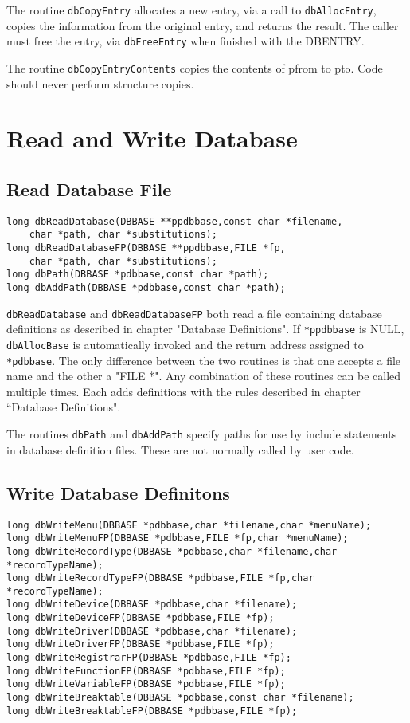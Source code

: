 The routine \verb|dbCopyEntry| allocates a new entry, via a call to \verb|dbAllocEntry|, copies the information from the original 
entry, and returns the result. The caller must free the entry, via \verb|dbFreeEntry| when finished with the DBENTRY.

The routine \verb|dbCopyEntryContents| copies the contents of pfrom to pto. Code should never perform structure copies.

\section{Read and Write Database}

\subsection{Read Database File}

\begin{verbatim}
long dbReadDatabase(DBBASE **ppdbbase,const char *filename,
    char *path, char *substitutions);
long dbReadDatabaseFP(DBBASE **ppdbbase,FILE *fp,
    char *path, char *substitutions);
long dbPath(DBBASE *pdbbase,const char *path);
long dbAddPath(DBBASE *pdbbase,const char *path);
\end{verbatim}

\verb|dbReadDatabase| and \verb|dbReadDatabaseFP| both read a file containing database definitions as described in chapter 
"Database Definitions". If \verb|*ppdbbase| is NULL, \verb|dbAllocBase| is automatically invoked and the return address 
assigned to \verb|*pdbbase|. The only difference between the two routines is that one accepts a file name and the other a 
"FILE *". Any combination of these routines can be called multiple times. Each adds definitions with the rules described 
in chapter ``Database Definitions".

The routines \verb|dbPath| and \verb|dbAddPath| specify paths for use by include statements in database definition files. These are 
not normally called by user code.

\subsection{Write Database Definitons}

\begin{verbatim}
long dbWriteMenu(DBBASE *pdbbase,char *filename,char *menuName);
long dbWriteMenuFP(DBBASE *pdbbase,FILE *fp,char *menuName);
long dbWriteRecordType(DBBASE *pdbbase,char *filename,char *recordTypeName);
long dbWriteRecordTypeFP(DBBASE *pdbbase,FILE *fp,char *recordTypeName);
long dbWriteDevice(DBBASE *pdbbase,char *filename);
long dbWriteDeviceFP(DBBASE *pdbbase,FILE *fp);
long dbWriteDriver(DBBASE *pdbbase,char *filename);
long dbWriteDriverFP(DBBASE *pdbbase,FILE *fp);
long dbWriteRegistrarFP(DBBASE *pdbbase,FILE *fp);
long dbWriteFunctionFP(DBBASE *pdbbase,FILE *fp);
long dbWriteVariableFP(DBBASE *pdbbase,FILE *fp);
long dbWriteBreaktable(DBBASE *pdbbase,const char *filename);
long dbWriteBreaktableFP(DBBASE *pdbbase,FILE *fp);
\end{verbatim}

